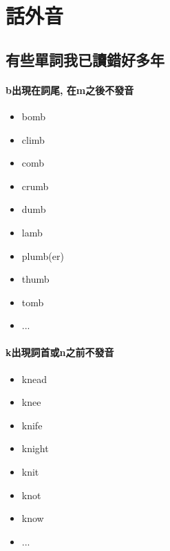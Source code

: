 \chapter{話外音}
\section{有些單詞我已讀錯好多年}
\subsubsection{b出現在詞尾, 在m之後不發音}
\begin{multicols}{3}
\begin{itemize}
  \itemsep0em
  \item bomb
  \item climb
  \item comb
  \item crumb
  \item dumb
  \item lamb
  \item plumb(er)
  \item thumb
  \item tomb
  \item ...
\end{itemize}
\end{multicols}

\subsubsection{k出現詞首或n之前不發音}
\begin{multicols}{3}
\begin{itemize}
  \itemsep0em
  \item knead
  \item knee
  \item knife
  \item knight
  \item knit
  \item knot
  \item know
  \item ...
\end{itemize}
\end{multicols}

